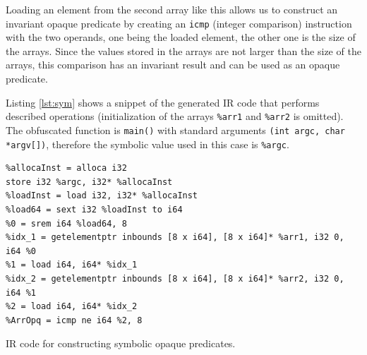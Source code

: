 \documentclass[
  digital, %
  notable,   %
  twoside, %
  nolof,     %
  nolot,     %
]{fithesis3}
\theoremstyle{definition}
\begin{document}

Loading an element from the second array like this allows us to construct an invariant opaque predicate by creating an \texttt{icmp} (integer comparison) instruction with the two operands, one being the loaded element, the other one is the size of the arrays. Since the values stored in the arrays are not larger than the size of the arrays, this comparison has an invariant result and can be used as an opaque predicate. 

Listing \ref{lst:sym} shows a snippet of the generated IR code that performs described operations (initialization of the arrays \texttt{\%arr1} and \texttt{\%arr2} is omitted). The obfuscated function is \texttt{main()} with standard arguments \texttt{(int argc, char *argv[])}, therefore the symbolic value used in this case is \texttt{\%argc}.

\begin{listing}[!h]
\begin{verbatim}
%allocaInst = alloca i32
store i32 %argc, i32* %allocaInst
%loadInst = load i32, i32* %allocaInst
%load64 = sext i32 %loadInst to i64
%0 = srem i64 %load64, 8
%idx_1 = getelementptr inbounds [8 x i64], [8 x i64]* %arr1, i32 0, i64 %0
%1 = load i64, i64* %idx_1
%idx_2 = getelementptr inbounds [8 x i64], [8 x i64]* %arr2, i32 0, i64 %1
%2 = load i64, i64* %idx_2
%ArrOpq = icmp ne i64 %2, 8
\end{verbatim}
\caption{IR code for constructing symbolic opaque predicates.}
\label{lst:sym}
\end{listing}
\end{document}

